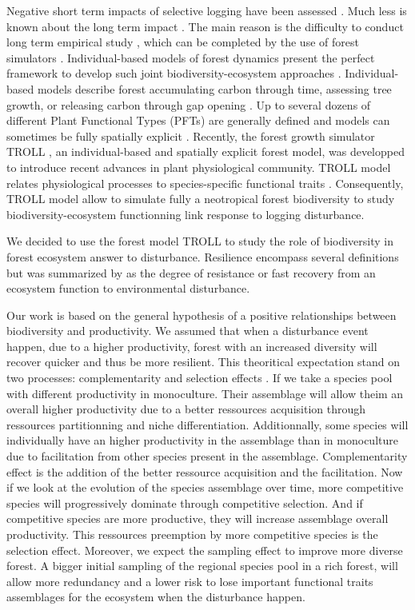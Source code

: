 \documentclass[12pt,]{article}
\theoremstyle{definition}
\theoremstyle{definition}
\theoremstyle{remark}
\begin{document}
Negative short term impacts of selective logging have been assessed
\citetext{\citealp{Carreno-Rocabado2012}; \citealp{DeAvila2015}; \citealp[but
see][]{Martin2015}}. Much less is known about the long term impact
\citep{Osazuwa-Peters2015}. The main reason is the difficulty to conduct
long term empirical study \citep[but see][]{Herault2010}, which can be
completed by the use of forest simulators
\citep{Huth2004, Khler2004, Ruger2008, Tietjen2006}. Individual-based
models of forest dynamics present the perfect framework to develop such
joint biodiversity-ecosystem approaches \citep{Li}. Individual-based
models describe forest accumulating carbon through time, assessing tree
growth, or releasing carbon through gap opening \citep{Bugmann2001}. Up
to several dozens of different Plant Functional Types (PFTs) are
generally defined and models can sometimes be fully spatially explicit
\citep{Pacala1996}. Recently, the forest growth simulator TROLL
\citep{Chave1999}, an individual-based and spatially explicit forest
model, was developped to introduce recent advances in plant
physiological community. TROLL model relates physiological processes to
species-specific functional traits \citep{Li}. Consequently, TROLL model
allow to simulate fully a neotropical forest biodiversity to study
biodiversity-ecosystem functionning link response to logging
disturbance.

We decided to use the forest model TROLL to study the role of
biodiversity in forest ecosystem answer to disturbance. Resilience
encompass several definitions but was summarized by \citet{Oliver2015}
as the degree of resistance or fast recovery from an ecosystem function
to environmental disturbance.

Our work is based on the general hypothesis of a positive relationships
between biodiversity and productivity. We assumed that when a
disturbance event happen, due to a higher productivity, forest with an
increased diversity will recover quicker and thus be more resilient.
This theoritical expectation stand on two processes: complementarity and
selection effects \citep{Loreau2001}. If we take a species pool with
different productivity in monoculture. Their assemblage will allow theim
an overall higher productivity due to a better ressources acquisition
through ressources partitionning and niche differentiation.
Additionnally, some species will individually have an higher
productivity in the assemblage than in monoculture due to facilitation
from other species present in the assemblage. Complementarity effect is
the addition of the better ressource acquisition and the facilitation.
Now if we look at the evolution of the species assemblage over time,
more competitive species will progressively dominate through competitive
selection. And if competitive species are more productive, they will
increase assemblage overall productivity. This ressources preemption by
more competitive species is the selection effect. Moreover, we expect
the sampling effect to improve more diverse forest. A bigger initial
sampling of the regional species pool in a rich forest, will allow more
redundancy and a lower risk to lose important functional traits
assemblages for the ecosystem when the disturbance happen.
\end{document}
